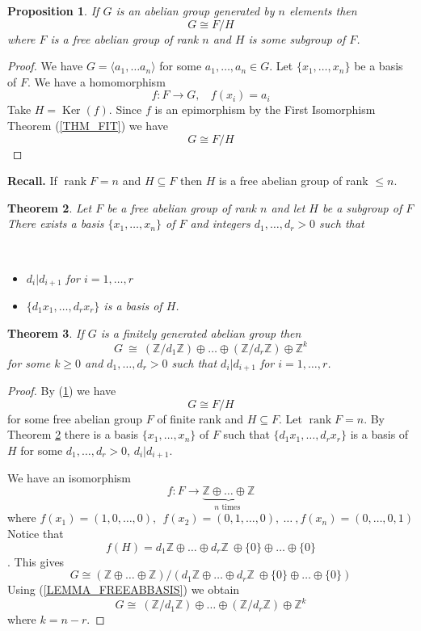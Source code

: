 \documentclass[12pt, letterpaper, oneside]{article}
\theoremstyle{plain}
\newtheorem{theorem}{Theorem}[section]
\newtheorem{proposition}[theorem]{Proposition}
\theoremstyle{definition}
\newcommand{\Z}{{\mathbb Z}}
\newcommand{\Ker}{\operatorname{Ker}}
\newcommand{\subgp}[1]{\langle#1\rangle}
\newcommand{\rank}{\operatorname{rank}}
\newcommand{\bit}{\begin{itemize}}
\newcommand{\eit}{\end{itemize}}
\newcommand{\vs}{\vskip 5mm}
\newcommand{\isep}[1][0]{\setlength{\itemsep}{#1 mm}}
\begin{document}
\vs


\begin{proposition}
\label{PROP_ABGPPRES}
If $G$ is an abelian group generated by $n$ elements then 
$$G\cong F/H$$
where $F$ is a free abelian group of rank $n$ and $H$ is some subgroup of $F$.
\end{proposition}

\begin{proof}
We have $G= \subgp{a_{1}, \dots a_{n}}$ for some $a_{1}, \dots, a_{n}\in G$.  
Let $\{x_{1}, \dots, x_{n}\}$ be a basis of $F$. We have a homomorphism
$$f\colon F \to G, \ \ \ \ f(x_{i}) = a_{i}$$
Take $H = \Ker(f)$. Since $f$ is an epimorphism by the First Isomorphism Theorem (\ref{THM_FIT})
we have 
$$G \cong F/H$$
\end{proof}



\vs

\textbf{Recall.} If $\rank F = n$ and $H \subseteq F$ then $H$ is a free abelian group of rank $\leq n$.


\vs\vs

\begin{theorem}
\label{THM_FREEABSUBGPBASIS}
Let $F$ be a free abelian group of rank $n$ and let $H$ be a subgroup of $F$
There exists a basis $\{x_{1}, \dots, x_{n}\}$ of $F$ and integers 
$d_{1}, \dots, d_{r}>0$ such that 

\vskip -13mm

\ 
\bit
\isep
\item $d_{i}| d_{i+1}$ for $i=1, \dots, r$ 
\item $\{d_{1}x_{1}, \dots, d_{r}x_{r}\}$ is a basis of $H$.
\eit
\end{theorem}

\vs

\begin{theorem}
\label{THM_CLASSFINGENABGPS1}
If $G$ is a finitely generated abelian group then 
$$G\ \cong \ (\Z/d_{1}\Z)  \oplus  {\dots} \oplus  (\Z/d_{r}\Z)  \oplus  \Z^{k}$$
for some $k\geq 0$ and $d_{1}, \dots, d_{r}>0$ such that $d_{i}| d_{i+1}$ for $i=1, \dots, r$.
\end{theorem}

\begin{proof}
By (\ref{PROP_ABGPPRES}) we have
$$G \cong F/H$$
for some  free abelian group $F$ of finite rank and $H\subseteq F$. Let $\rank F = n$. 
By Theorem \ref{THM_FREEABSUBGPBASIS} there is a basis  $\{x_{1}, \dots, x_{n}\}$ of $F$
such that $\{d_{1}x_{1}, \dots, d_{r}x_{r}\}$ is a basis of $H$ for some $d_{1}, \dots, d_{r} >0$, 
$d_{i}|d_{i+1}$.

We have an isomorphism 
$$f\colon F \to \underbrace{\Z\oplus \dots \oplus \Z}_{\text{$n$ times }}$$
where $f(x_{1}) = (1, 0, \dots, 0), \ \ f(x_{2}) = (0, 1, \dots, 0),\  \dots\ , f(x_{n}) = (0, \dots, 0, 1)$
Notice that 
$$f(H) = d_{1}\Z \oplus {\dots} \oplus d_{r}\Z \  \oplus \{0\} \oplus{\dots} \oplus \{0\}$$. 
This gives 
$$G \cong (\Z\oplus\dots\oplus \Z)/ (d_{1}\Z\oplus {\dots} \oplus d_{r}\Z \ \oplus \{0\}\oplus {\dots} \oplus \{0\})$$
Using (\ref{LEMMA_FREEABBASIS}) we obtain 
$$G\cong \ (\Z/d_{1}\Z)  \oplus  {\dots} \oplus  (\Z/d_{r}\Z)  \oplus  \Z^{k}$$
where $k = n-r$.
\end{proof}
\end{document}
